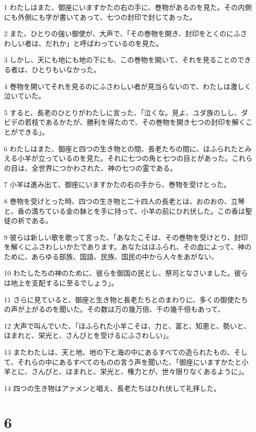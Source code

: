 \par 1 わたしはまた、御座にいますかたの右の手に、巻物があるのを見た。その内側にも外側にも字が書いてあって、七つの封印で封じてあった。
\par 2 また、ひとりの強い御使が、大声で、「その巻物を開き、封印をとくのにふさわしい者は、だれか」と呼ばわっているのを見た。
\par 3 しかし、天にも地にも地の下にも、この巻物を開いて、それを見ることのできる者は、ひとりもいなかった。
\par 4 巻物を開いてそれを見るのにふさわしい者が見当らないので、わたしは激しく泣いていた。
\par 5 すると、長老のひとりがわたしに言った、「泣くな。見よ、ユダ族のしし、ダビデの若枝であるかたが、勝利を得たので、その巻物を開き七つの封印を解くことができる」。
\par 6 わたしはまた、御座と四つの生き物との間、長老たちの間に、ほふられたとみえる小羊が立っているのを見た。それに七つの角と七つの目とがあった。これらの目は、全世界につかわされた、神の七つの霊である。
\par 7 小羊は進み出て、御座にいますかたの右の手から、巻物を受けとった。
\par 8 巻物を受けとった時、四つの生き物と二十四人の長老とは、おのおの、立琴と、香の満ちている金の鉢とを手に持って、小羊の前にひれ伏した。この香は聖徒の祈である。
\par 9 彼らは新しい歌を歌って言った、「あなたこそは、その巻物を受けとり、封印を解くにふさわしいかたであります。あなたはほふられ、その血によって、神のために、あらゆる部族、国語、民族、国民の中から人々をあがない、
\par 10 わたしたちの神のために、彼らを御国の民とし、祭司となさいました。彼らは地上を支配するに至るでしょう」。
\par 11 さらに見ていると、御座と生き物と長老たちとのまわりに、多くの御使たちの声が上がるのを聞いた。その数は万の幾万倍、千の幾千倍もあって、
\par 12 大声で叫んでいた、「ほふられた小羊こそは、力と、富と、知恵と、勢いと、ほまれと、栄光と、さんびとを受けるにふさわしい」。
\par 13 またわたしは、天と地、地の下と海の中にあるすべての造られたもの、そして、それらの中にあるすべてのものの言う声を聞いた、「御座にいますかたと小羊とに、さんびと、ほまれと、栄光と、権力とが、世々限りなくあるように」。
\par 14 四つの生き物はアァメンと唱え、長老たちはひれ伏して礼拝した。

\chapter{6}


